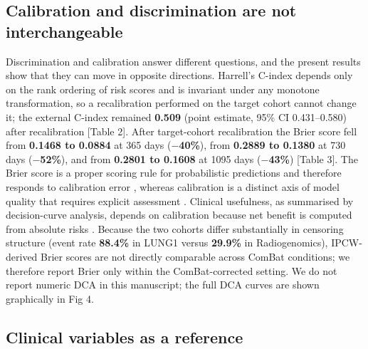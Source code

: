 \documentclass[a4paper,fleqn]{cas-sc}
\begin{document}
\subsection{Calibration and discrimination are not interchangeable}

Discrimination and calibration answer different questions, and the present results show that they can move in opposite directions. Harrell's C-index depends only on the rank ordering of risk scores and is invariant under any monotone transformation, so a recalibration performed on the target cohort cannot change it; the external C-index remained \textbf{0.509} (point estimate, 95\% CI 0.431--0.580) after recalibration [Table 2]. After target-cohort recalibration the Brier score fell from \textbf{0.1468 to 0.0884} at 365 days (\textbf{$-$40\%}), from \textbf{0.2889 to 0.1380} at 730 days (\textbf{$-$52\%}), and from \textbf{0.2801 to 0.1608} at 1095 days (\textbf{$-$43\%}) [Table 3]. The Brier score is a proper scoring rule for probabilistic predictions and therefore responds to calibration error \citep{brier1950,gneiting2007}, whereas calibration is a distinct axis of model quality that requires explicit assessment \citep{vancalster2019,crowson2016,shin2022}. Clinical usefulness, as summarised by decision-curve analysis, depends on calibration because net benefit is computed from absolute risks \citep{vickers2006,vickers2023,zhao2024}. Because the two cohorts differ substantially in censoring structure (event rate \textbf{88.4\%} in LUNG1 versus \textbf{29.9\%} in Radiogenomics), IPCW-derived Brier scores are not directly comparable across ComBat conditions; we therefore report Brier only within the ComBat-corrected setting. We do not report numeric DCA in this manuscript; the full DCA curves are shown graphically in Fig 4.

\subsection{Clinical variables as a reference}
\end{document}

